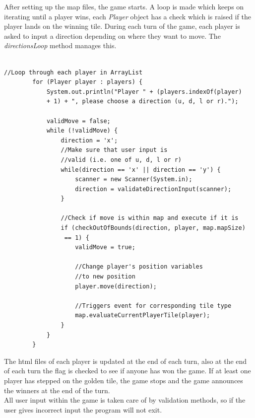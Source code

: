 \documentclass[a4paper,12pt]{extarticle}
\begin{document}
\newpage
\noindent After setting up the map files, the game starts. A loop is made which keeps on iterating until a player wins, each \textit{Player} object has a check which is raised if the player lands on the winning tile. During each turn of the game, each player is asked to input a direction depending on where they want to move. The \textit{directionsLoop} method manages this.\\

\begin{lstlisting}

//Loop through each player in ArrayList
        for (Player player : players) {
            System.out.println("Player " + (players.indexOf(player) 
            + 1) + ", please choose a direction (u, d, l or r).");

            validMove = false;
            while (!validMove) {
                direction = 'x';
                //Make sure that user input is
                //valid (i.e. one of u, d, l or r)
                while(direction == 'x' || direction == 'y') {
                    scanner = new Scanner(System.in);
                    direction = validateDirectionInput(scanner);
                }

                //Check if move is within map and execute if it is
                if (checkOutOfBounds(direction, player, map.mapSize)
                 == 1) {
                    validMove = true;

                    //Change player's position variables 
                    //to new position
                    player.move(direction);

                    //Triggers event for corresponding tile type
                    map.evaluateCurrentPlayerTile(player);
                }
            }
        }

\end{lstlisting}
\vspace{4mm}

\noindent The html files of each player is updated at the end of each turn, also at the end of each turn the flag is checked to see if anyone has won the game. If at least one player has stepped on the golden tile, the game stops and the game announces the winners at the end of the turn.\\

\noindent All user input within the game is taken care of by validation methods, so if the user gives incorrect input the program will not exit.\\
\newpage
\end{document}

